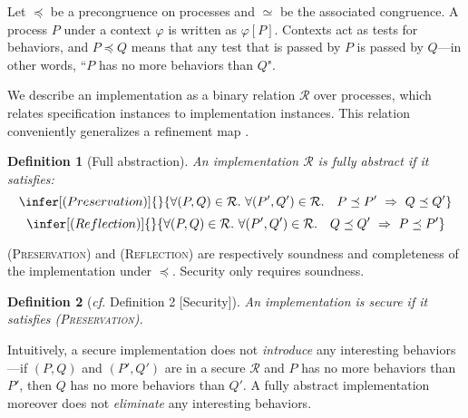 \documentclass[10pt]{article}
\newtheorem{definition}{Definition}
\begin{document}
Let $\preceq$ be a precongruence on processes and $\simeq$ be the associated congruence. A process $P$ under a context $\varphi$ is written as $\varphi[P]$. Contexts act as tests for behaviors, and $P \preceq Q$ means that any test that is passed by $P$ is passed by $Q$---in other words, ``$P$ has no more behaviors than $Q$". 

We describe an implementation as a binary relation $\mathcal R$ over processes, which relates specification instances to implementation instances. This relation conveniently generalizes a refinement map \cite{refmap}. 

\begin{definition}[Full abstraction] An implementation $\mathcal R$ is fully abstract if it satisfies:$$\infer[(Preservation)]{}{\forall (P,Q) \in \mathcal R.~\forall (P',Q') \in \mathcal R.~~~P \preceq P' ~\Rightarrow~ Q \preceq Q'}$$
$$\infer[(Reflection)]{}{\forall (P,Q) \in \mathcal R.~\forall (P',Q') \in \mathcal R.~~~Q \preceq Q' ~\Rightarrow~ P \preceq P'}$$
\end{definition}
\noindent
(\textsc{Preservation}) and (\textsc{Reflection}) are respectively soundness and completeness of the implementation under $\preceq$. Security only requires soundness.
\begin{definition}[\emph{cf.} Definition 2 [Security$\mbox{]}$] An implementation is secure if it satisfies \textsc{(Preservation)}.
\end{definition}
\noindent
Intuitively, a secure implementation does not \emph{introduce} any interesting behaviors---if $(P,Q)$ and $(P',Q')$ are in a secure $\mathcal R$ and $P$ has no more behaviors than $P'$, then $Q$ has no more behaviors than $Q'$. A fully abstract implementation moreover does not \emph{eliminate} any interesting behaviors.
\end{document}
